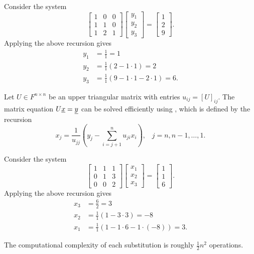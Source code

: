 \begin{example}
Consider the system
\begin{equation*}
\left[ \begin{array}{ccc} 1 & 0 & 0 \\ 1 & 1 & 0 \\ 1 & 2 & 1 \end{array} \right]
\left[ \begin{array}{c} y_1 \\ y_2 \\ y_3 \end{array} \right]
 = \left[ \begin{array}{c} 1 \\ 2 \\ 9 \end{array} \right].
\end{equation*}
Applying the above recursion gives
\begin{align*}
y_1 & = \frac{1}{1}  = 1 \\
y_2 & = \frac{1}{1} (2 - 1\cdot 1)  = 2 \\
y_3 & = \frac{1}{1} (9 - 1\cdot 1 - 2\cdot 1) = 6.
\end{align*}
\end{example}

Let $U \in F^{n \times n}$ be an upper triangular matrix with entries $u_{ij} = [ U ]_{ij}$.
The matrix equation $U \underline{x} = \underline{y}$ can be solved efficiently using , which is defined by the recursion
\begin{equation*}
x_j = \frac{1}{u_{jj}} \left( y_j - \sum_{i=j+1}^{n} u_{ji} x_i \right), \;\;\; j=n,n-1,\ldots,1.
\end{equation*}

\begin{example}
Consider the system
\begin{equation*}
\left[ \begin{array}{ccc} 1 & 1 & 1 \\ 0 & 1 & 3 \\ 0 & 0 & 2 \end{array} \right]
\left[ \begin{array}{c} x_1 \\ x_2 \\ x_3 \end{array} \right]
 = \left[ \begin{array}{c} 1 \\ 1 \\ 6 \end{array} \right].
\end{equation*}
Applying the above recursion gives
\begin{align*}
x_3 & = \frac{6}{2} = 3 \\
x_2 & = \frac{1}{1} (1 - 3\cdot 3) = -8 \\
x_1 & = \frac{1}{1} (1 - 1\cdot 6 - 1\cdot (-8) ) = 3. 
\end{align*}
\end{example}
The computational complexity of each substitution is roughly $\frac{1}{2} n^2$ operations.

